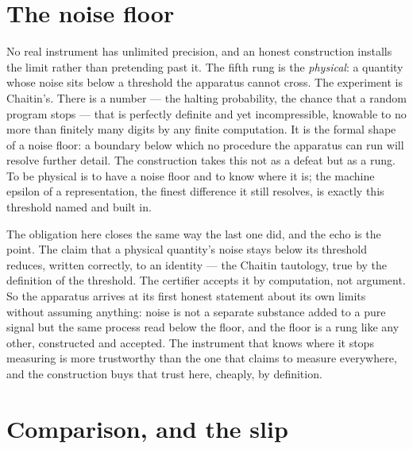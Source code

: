 \section{The noise floor}
\label{se:the-noise-floor}

No real instrument has unlimited precision, and an honest construction installs the limit rather than
pretending past it. The fifth rung is the \emph{physical}: a quantity whose noise sits below a threshold
the apparatus cannot cross. The experiment is Chaitin's. There is a number --- the halting probability,
the chance that a random program stops --- that is perfectly definite and yet incompressible, knowable to
no more than finitely many digits by any finite computation. It is the formal shape of a noise floor: a
boundary below which no procedure the apparatus can run will resolve further detail. The construction takes
this not as a defeat but as a rung. To be physical is to have a noise floor and to know where it is; the
machine epsilon of a representation, the finest difference it still resolves, is exactly this threshold
named and built in.

The obligation here closes the same way the last one did, and the echo is the point. The claim that a
physical quantity's noise stays below its threshold reduces, written correctly, to an identity --- the
Chaitin tautology, true by the definition of the threshold. The certifier accepts it by computation, not
argument. So the apparatus arrives at its first honest statement about its own limits without assuming
anything: noise is not a separate substance added to a pure signal but the same process read below the
floor, and the floor is a rung like any other, constructed and accepted. The instrument that knows where it
stops measuring is more trustworthy than the one that claims to measure everywhere, and the construction
buys that trust here, cheaply, by definition.

\section{Comparison, and the slip}
\label{se:comparison-and-the-slip}

